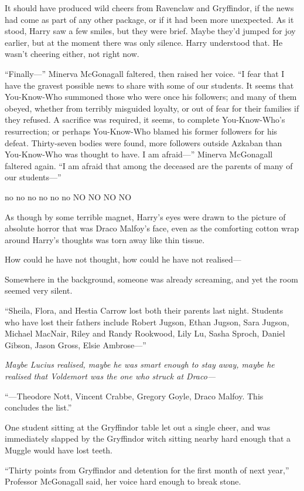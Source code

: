 It should have produced wild cheers from Ravenclaw and Gryffindor, if the news
had come as part of any other package, or if it had been more unexpected. As it
stood, Harry saw a few smiles, but they were brief. Maybe they’d jumped for joy
earlier, but at the moment there was only silence. Harry understood that. He
wasn’t cheering either, not right now.

“Finally—” Minerva McGonagall faltered, then raised her voice. “I fear that I
have the gravest possible news to share with some of our students. It seems
that You-Know-Who summoned those who were once his followers; and many of them
obeyed, whether from terribly misguided loyalty, or out of fear for their
families if they refused. A sacrifice was required, it seems, to complete
You-Know-Who’s resurrection; or perhaps You-Know-Who blamed his former
followers for his defeat. Thirty-seven bodies were found, more followers
outside Azkaban than You-Know-Who was thought to have. I am afraid—” Minerva
McGonagall faltered again. “I am afraid that among the deceased are the parents
of many of our students—”

no no no no no no NO NO NO NO

As though by some terrible magnet, Harry’s eyes were drawn to the picture of
absolute horror that was Draco Malfoy’s face, even as the comforting cotton
wrap around Harry’s thoughts was torn away like thin tissue.

How could he have not thought, how could he have not realised—

Somewhere in the background, someone was already screaming, and yet the room
seemed very silent.

“Sheila, Flora, and Hestia Carrow lost both their parents last night. Students
who have lost their fathers include Robert Jugson, Ethan Jugson, Sara Jugson,
Michael MacNair, Riley and Randy Rookwood, Lily Lu, Sasha Sproch, Daniel
Gibson, Jason Gross, Elsie Ambrose—”

\emph{Maybe Lucius realised, maybe he was smart enough to stay away, maybe he
realised that Voldemort was the one who struck at Draco—}

“—Theodore Nott, Vincent Crabbe, Gregory Goyle, Draco Malfoy. This concludes
the list.”

One student sitting at the Gryffindor table let out a single cheer, and was
immediately slapped by the Gryffindor witch sitting nearby hard enough that a
Muggle would have lost teeth.

“Thirty points from Gryffindor and detention for the first month of next year,”
Professor McGonagall said, her voice hard enough to break stone.

